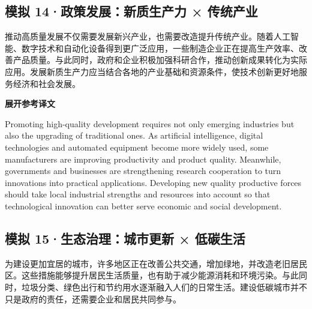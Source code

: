 \documentclass[a4paper,11pt,UTF8,fontset=none]{ctexart}
\begin{document}
\vspace{4pt}

\subsection{模拟 14·政策发展：新质生产力 × 传统产业}

\par

\noindent 推动高质量发展不仅需要发展新兴产业，也需要改造提升传统产业。随着人工智能、数字技术和自动化设备得到更广泛应用，一些制造企业正在提高生产效率、改善产品质量。与此同时，政府和企业积极加强科研合作，推动创新成果转化为实际应用。发展新质生产力应当结合各地的产业基础和资源条件，使技术创新更好地服务经济和社会发展。\par

\noindent\colorbox{HeadBlue}{\strut {\bfseries 展开参考译文}}\par\vspace{1pt}

\noindent Promoting high-quality development requires not only emerging industries but also the upgrading of traditional ones. As artificial intelligence, digital technologies and automated equipment become more widely used, some manufacturers are improving productivity and product quality. Meanwhile, governments and businesses are strengthening research cooperation to turn innovations into practical applications. Developing new quality productive forces should take local industrial strengths and resources into account so that technological innovation can better serve economic and social development.\par

\vspace{4pt}

\subsection{模拟 15·生态治理：城市更新 × 低碳生活}

\par

\noindent 为建设更加宜居的城市，许多地区正在改善公共交通，增加绿地，并改造老旧居民区。这些措施能够提升居民生活质量，也有助于减少能源消耗和环境污染。与此同时，垃圾分类、绿色出行和节约用水逐渐融入人们的日常生活。建设低碳城市并不只是政府的责任，还需要企业和居民共同参与。\par
\end{document}
